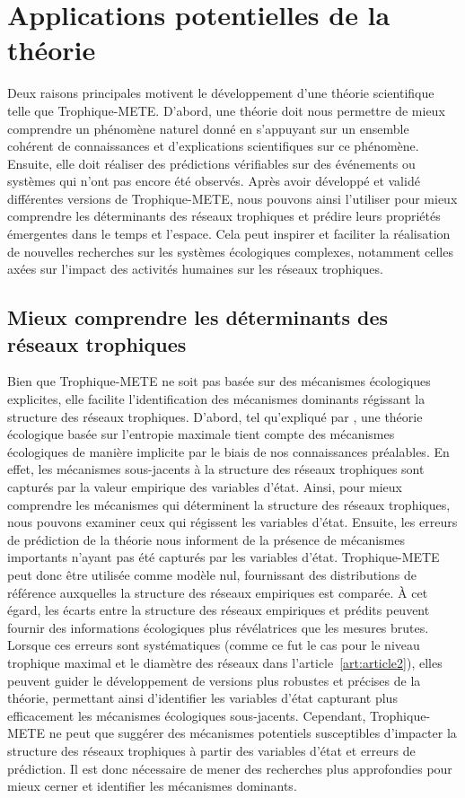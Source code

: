 
\section{Applications potentielles de la théorie} 

Deux raisons principales motivent le développement d'une théorie scientifique
telle que Trophique-METE. D'abord, une théorie doit nous permettre de mieux
comprendre un phénomène naturel donné en s'appuyant sur un ensemble cohérent de
connaissances et d'explications scientifiques sur ce phénomène. Ensuite, elle
doit réaliser des prédictions vérifiables sur des événements ou systèmes qui
n'ont pas encore été observés. Après avoir développé et validé différentes
versions de Trophique-METE, nous pouvons ainsi l'utiliser pour mieux comprendre
les déterminants des réseaux trophiques et prédire leurs propriétés émergentes
dans le temps et l'espace. Cela peut inspirer et faciliter la réalisation de
nouvelles recherches sur les systèmes écologiques complexes, notamment celles
axées sur l'impact des activités humaines sur les réseaux trophiques.

\subsection{Mieux comprendre les déterminants des réseaux trophiques} 

Bien que Trophique-METE ne soit pas basée sur des mécanismes écologiques
explicites, elle facilite l'identification des mécanismes dominants régissant la
structure des réseaux trophiques. D'abord, tel qu'expliqué par
\textcite{Harte2014Maximum}, une théorie écologique basée sur l'entropie
maximale tient compte des mécanismes écologiques de manière implicite par le
biais de nos connaissances préalables. En effet, les mécanismes sous-jacents à
la structure des réseaux trophiques sont capturés par la valeur empirique des
variables d'état. Ainsi, pour mieux comprendre les mécanismes qui déterminent la
structure des réseaux trophiques, nous pouvons examiner ceux qui régissent les
variables d'état. Ensuite, les erreurs de prédiction de la théorie nous
informent de la présence de mécanismes importants n'ayant pas été capturés par
les variables d'état. Trophique-METE peut donc être utilisée comme modèle nul,
fournissant des distributions de référence auxquelles la structure des réseaux
empiriques est comparée. À cet égard, les écarts entre la structure des réseaux
empiriques et prédits peuvent fournir des informations écologiques plus
révélatrices que les mesures brutes. Lorsque ces erreurs sont systématiques
(comme ce fut le cas pour le niveau trophique maximal et le diamètre des réseaux
dans l'article~\ref{art:article2}), elles peuvent guider le développement de
versions plus robustes et précises de la théorie, permettant ainsi d'identifier
les variables d'état capturant plus efficacement les mécanismes écologiques
sous-jacents. Cependant, Trophique-METE ne peut que suggérer des mécanismes
potentiels susceptibles d'impacter la structure des réseaux trophiques à partir
des variables d'état et erreurs de prédiction. Il est donc nécessaire de mener
des recherches plus approfondies pour mieux cerner et identifier les mécanismes
dominants.


